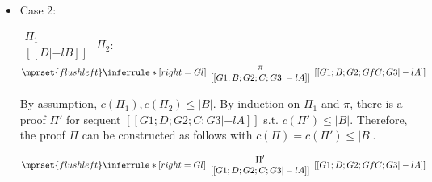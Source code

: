 \begin{itemize}
\item Case 2:
      \begin{center}
        \scriptsize
        \begin{math}
          \begin{array}{c}
            \Pi_1 \\
            {[[D |-l B]]}
          \end{array}
        \end{math}
        \qquad\qquad
        $\Pi_2$:
        \begin{math}
          $$\mprset{flushleft}
          \inferrule* [right={\tiny Gl}] {
            {
              \begin{array}{c}
                \pi \\
                {[[G1; B; G2; C; G3 |-l A]]}
              \end{array}
            }
          }{[[G1; B; G2; Gf C; G3 |-l A]]}
        \end{math}
      \end{center}
      By assumption, $c(\Pi_1),c(\Pi_2)\leq |B|$. By induction on $\Pi_1$
      and $\pi$, there is a proof $\Pi'$ for sequent
      $[[G1; D; G2; C; G3 |-l A]]$ s.t. $c(\Pi') \leq |B|$. Therefore, the
      proof $\Pi$ can be constructed as follows with
      $c(\Pi) = c(\Pi') \leq |B|$.
      \begin{center}
        \scriptsize
        \begin{math}
          $$\mprset{flushleft}
          \inferrule* [right={\tiny Gl}] {
            {
              \begin{array}{c}
                \Pi' \\
                {[[G1; D; G2; C; G3 |-l A]]}
              \end{array}
            }
          }{[[G1; D; G2; Gf C; G3 |-l A]]}
        \end{math}
      \end{center}


\end{itemize}
